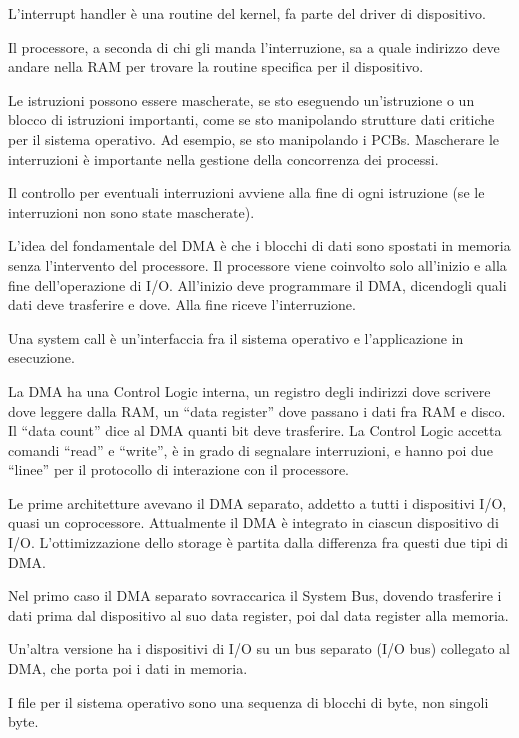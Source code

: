 L'interrupt handler \`e una routine del kernel, fa parte del driver di dispositivo.

Il processore, a seconda di chi gli manda l'interruzione, sa a quale indirizzo deve andare nella RAM per trovare la routine specifica per il dispositivo.

Le istruzioni possono essere mascherate, se sto eseguendo un'istruzione o un blocco di istruzioni importanti, come se sto manipolando strutture dati critiche per il sistema operativo. Ad esempio, se sto manipolando i PCBs. Mascherare le interruzioni \`e importante nella gestione della concorrenza dei processi.

Il controllo per eventuali interruzioni avviene alla fine di ogni istruzione (se le interruzioni non sono state mascherate).

L'idea del fondamentale del DMA \`e che i blocchi di dati sono spostati in memoria senza l'intervento del processore. Il processore viene coinvolto solo all'inizio e alla fine dell'operazione di I/O. All'inizio deve programmare il DMA, dicendogli quali dati deve trasferire e dove. Alla fine riceve l'interruzione.

Una system call \`e un'interfaccia fra il sistema operativo e l'applicazione in esecuzione.

La DMA ha una Control Logic interna, un registro degli indirizzi dove scrivere dove leggere dalla RAM, un ``data register'' dove passano i dati fra RAM e disco. Il ``data count'' dice al DMA quanti bit deve trasferire. La Control Logic accetta comandi ``read'' e ``write'', \`e in grado di segnalare interruzioni, e hanno poi due ``linee'' per il protocollo di interazione con il processore.

Le prime architetture avevano il DMA separato, addetto a tutti i dispositivi I/O, quasi un coprocessore. Attualmente il DMA \`e integrato in ciascun dispositivo di I/O. L'ottimizzazione dello storage \`e partita dalla differenza fra questi due tipi di DMA.

Nel primo caso il DMA separato sovraccarica il System Bus, dovendo trasferire i dati prima dal dispositivo al suo data register, poi dal data register alla memoria.

Un'altra versione ha i dispositivi di I/O su un bus separato (I/O bus) collegato al DMA, che porta poi i dati in memoria.

I file per il sistema operativo sono una sequenza di blocchi di byte, non singoli byte.

